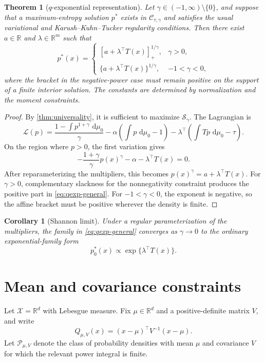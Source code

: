 \documentclass[pdflatex,sn-mathphys-num]{sn-jnl}
\theoremstyle{thmstyleone}
\newtheorem{theorem}{Theorem}
\newtheorem{corollary}{Corollary}
\theoremstyle{thmstyletwo}
\theoremstyle{thmstylethree}
\newcommand{\dd}{\,\mathrm{d}}
\newcommand{\R}{\mathbb{R}}
\newcommand{\calX}{\mathcal{X}}
\newcommand{\calP}{\mathcal{P}}
\newcommand{\calC}{\mathcal{C}}
\newcommand{\calS}{\mathcal{S}}
\newcommand{\pos}[1]{\left[#1\right]_+}
\begin{document}
\begin{theorem}[$q$-exponential representation]\label{thm:qexp}
Let $\gamma\in(-1,\infty)\setminus\{0\}$, and suppose that a maximum-entropy solution $p^*$ exists in $\calC_{\tau,\gamma}$ and satisfies the usual variational and Karush--Kuhn--Tucker regularity conditions. Then there exist $a\in\R$ and $\lambda\in\R^m$ such that
\begin{equation}
 p^*(x)=
 \begin{cases}
 \pos{a+\lambda^\top T(x)}^{1/\gamma},&\gamma>0,\\[1mm]
 \{a+\lambda^\top T(x)\}^{1/\gamma},&-1<\gamma<0,
 \end{cases}
\label{eq:qexp-general}
\end{equation}
where the bracket in the negative-power case must remain positive on the support of a finite interior solution. The constants are determined by normalization and the moment constraints.
\end{theorem}

\begin{proof}
By \cref{thm:universality}, it is sufficient to maximize $\calS_\gamma$. The Lagrangian is
\[
 \mathcal L(p)
 =
 \frac{1-\int p^{1+\gamma}\,\dd\mu_0}{\gamma}
 -\alpha\left(\int p\,\dd\mu_0-1\right)
 -\lambda^\top\left(\int Tp\,\dd\mu_0-\tau\right).
\]
On the region where $p>0$, the first variation gives
\[
 -\frac{1+\gamma}{\gamma}p(x)^\gamma
 -\alpha-\lambda^\top T(x)=0.
\]
After reparameterizing the multipliers, this becomes $p(x)^\gamma=a+\lambda^\top T(x)$. For $\gamma>0$, complementary slackness for the nonnegativity constraint produces the positive part in \cref{eq:qexp-general}. For $-1<\gamma<0$, the exponent is negative, so the affine bracket must be positive wherever the density is finite.
\end{proof}

\begin{corollary}[Shannon limit]\label{cor:shannon-limit}
Under a regular parameterization of the multipliers, the family in \cref{eq:qexp-general} converges as $\gamma\to0$ to the ordinary exponential-family form
\[
 p_0^*(x)\propto\exp\{\lambda^\top T(x)\}.
\]
\end{corollary}

\section{Mean and covariance constraints}\label{sec:mean-cov}

Let $\calX=\R^d$ with Lebesgue measure. Fix $\mu\in\R^d$ and a positive-definite matrix $V$, and write
\[
 Q_{\mu,V}(x)=(x-\mu)^\top V^{-1}(x-\mu).
\]
Let $\calP_{\mu,V}$ denote the class of probability densities with mean $\mu$ and covariance $V$ for which the relevant power integral is finite.
\end{document}
